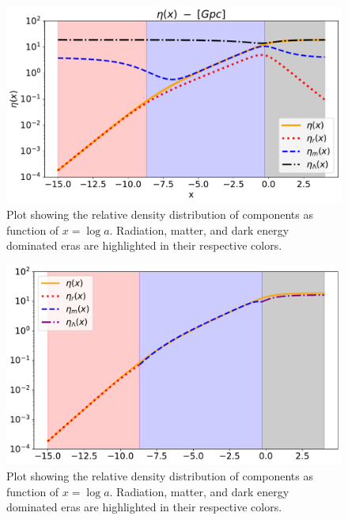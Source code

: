 \documentclass[10pt, a4paper]{article}
\begin{document}
\begin{figure}[H]
    \centering
    \includegraphics[scale=0.5]{../m1_figs/Eta.pdf}
    \caption{Plot showing the relative density distribution of components as function of $x=\log{a}$. Radiation, matter, and dark energy dominated eras are highlighted in their respective colors.}
    \label{fig:Eta}
\end{figure}

\begin{figure}[H]
    \centering
    \includegraphics[scale=0.5]{../m1_figs/Eta2.pdf}
    \caption{Plot showing the relative density distribution of components as function of $x=\log{a}$. Radiation, matter, and dark energy dominated eras are highlighted in their respective colors.}
    \label{fig:Eta2}
\end{figure}
\end{document}

